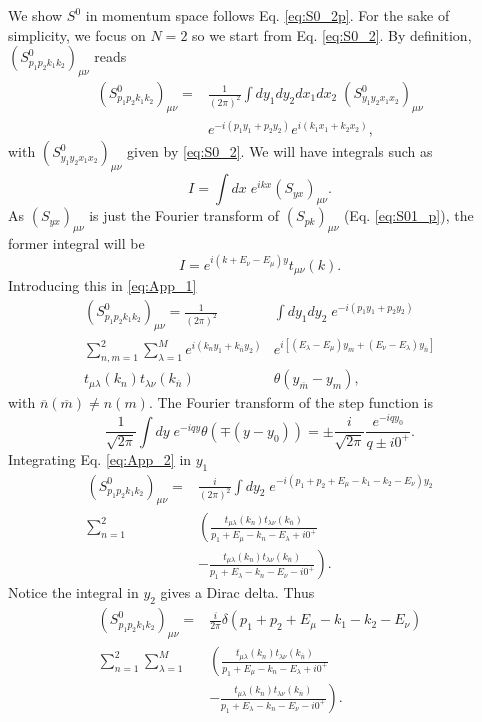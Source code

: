 \documentclass[aps,pra,reprint,amsmath,amssymb]{revtex4-1}
\begin{document}
We show $S^0$ in momentum space follows Eq. \eqref{eq:S0_2p}. For the sake of simplicity, we focus on $N=2$ so we start from Eq. \eqref{eq:S0_2}. By definition, $(S^0_{p_1p_2k_1k_2})_{\mu\nu}$ reads
\begin{align}\label{eq:App_1}
(S_{p_1p_2k_1k_2}^0)_{\mu\nu}=&\frac{1}{(2\pi)^2}\int  dy_1dy_2dx_1dx_2\; (S_{y_1y_2x_1x_2}^0)_{\mu\nu}\nonumber\\
& e^{-i(p_1y_1+p_2y_2)}  e^{i(k_1x_1+k_2x_2)},
\end{align}
with $(S_{y_1y_2x_1x_2}^0)_{\mu\nu}$ given by \eqref{eq:S0_2}. We will have integrals such as
\begin{equation}
I=\int dx\; e^{ikx}(S_{yx})_{\mu\nu}.
\end{equation}
As $(S_{yx})_{\mu\nu}$ is just the Fourier transform of $(S_{pk})_{\mu\nu}$ (Eq. \eqref{eq:S01_p}), the former integral will be
\begin{equation}
I=e^{i(k+E_\nu-E_\mu)y}t_{\mu\nu}(k).
\end{equation}
Introducing this in \eqref{eq:App_1}
\begin{align}\label{eq:App_2}
(S_{p_1p_2k_1k_2}^0)_{\mu\nu}=\frac{1}{(2\pi)^2} &\int dy_1 dy_2\; e^{-i(p_1y_1+p_2y_2)}\nonumber\\
\sum_{n,m=1}^2 \sum_{\lambda=1}^M e^{i(k_ny_1 + k_{\overline{n}} y_2)}& e^{i[(E_\lambda-E_\mu)y_m+(E_\nu-E_\lambda)y_{\overline{n}}]} \nonumber\\
t_{\mu\lambda}(k_n)t_{\lambda\nu}(k_{\overline{n}})& \theta(y_{\overline{m}}-y_m),
\end{align}
with $\overline{n}(\overline{m})\neq n(m)$. The Fourier transform of the step function is
\begin{equation}
\frac{1}{\sqrt{2\pi}}\int dy \; e^{-iqy}\theta(\mp(y-y_0))=\pm\frac{i}{\sqrt{2\pi}}\frac{e^{-iqy_0}}{q\pm i0^+}.
\end{equation}
Integrating Eq. \eqref{eq:App_2} in $y_1$
\begin{align}
(S_{p_1p_2k_1k_2}^0)_{\mu\nu}=&\frac{i}{(2\pi)^2} \int dy_2\; e^{-i(p_1+p_2+E_\mu-k_1-k_2-E_\nu)y_2} \nonumber\\
\sum_{n=1}^2 & \left( \frac{t_{\mu\lambda}(k_n)t_{\lambda\nu}(k_{\overline{n}})}{p_1+E_\mu-k_n-E_\lambda+i0^+} \right. \nonumber\\
&\left. -\frac{t_{\mu\lambda}(k_n)t_{\lambda\nu}(k_{\overline{n}})}{p_1+E_\lambda-k_n-E_\nu-i0^+}\right).
\end{align}
Notice the integral in $y_2$ gives a Dirac delta. Thus
\begin{align}
(S_{p_1p_2k_1k_2}^0)_{\mu\nu}=&\frac{i}{2\pi} \delta(p_1+p_2+E_\mu-k_1-k_2-E_\nu) \nonumber\\
\sum_{n=1}^2 \sum_{\lambda=1}^M& \left( \frac{t_{\mu\lambda}(k_n)t_{\lambda\nu}(k_{\overline{n}})}{p_1+E_\mu-k_n-E_\lambda+i0^+} \right. \nonumber\\
&\left. -\frac{t_{\mu\lambda}(k_n)t_{\lambda\nu}(k_{\overline{n}})}{p_1+E_\lambda-k_n-E_\nu-i0^+}\right).
\end{align}
\end{document}
